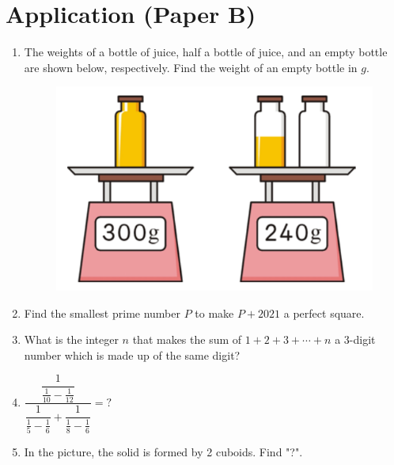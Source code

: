 \documentclass[11pt]{scrartcl}
\begin{document}
\section{Application (Paper B)}
\begin{enumerate}
    \item The weights of a bottle of juice, half a bottle of juice, and an empty bottle are shown below, respectively. Find the weight of an empty bottle in $g$.
    
    \begin{figure}[h]
        \centering
        \includegraphics[scale=0.6]{StarGen/0Figure/wmi-2021-6b-bottle-juice.png}
    \end{figure}
    
    \item Find the smallest prime number $P$ to make $P + 2021$ a perfect square.
    
    \item What is the integer $n$ that makes the sum of $1 + 2 + 3 + \cdots + n$ a 3-digit number which is made up of the same digit?
    
    \item $\dfrac{\dfrac{1}{\frac{1}{10} - \frac{1}{12}}}{\dfrac{1}{\frac{1}{5} - \frac{1}{6}} + \dfrac{1}{\frac{1}{8} - \frac{1}{6}}} = ?$
    
    \item In the picture, the solid is formed by 2 cuboids. Find "?".
    

\end{enumerate}
\end{document}
